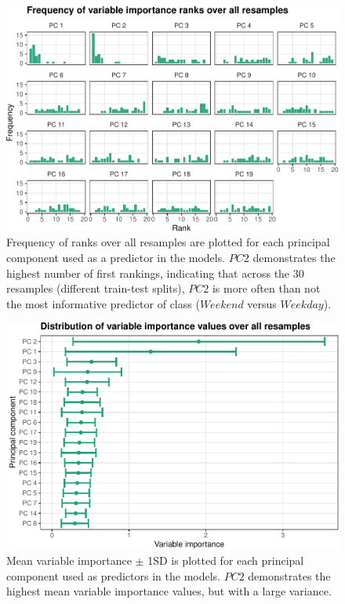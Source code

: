 \documentclass{article}
\begin{document}
\begin{figure}
\centering
\includegraphics{olet5610_report_files/figure-latex/impranks-1.pdf}
\caption{Frequency of ranks over all resamples are plotted for each
principal component used as a predictor in the models. \(PC 2\)
demonstrates the highest number of first rankings, indicating that
across the 30 resamples (different train-test splits), \(PC 2\) is more
often than not the most informative predictor of class (\(Weekend\)
versus \(Weekday\)).}
\end{figure}

\begin{figure}
\centering
\includegraphics{olet5610_report_files/figure-latex/impdists-1.pdf}
\caption{Mean variable importance \(\pm\) 1SD is plotted for each
principal component used as predictors in the models. \(PC 2\)
demonstrates the highest mean variable importance values, but with a
large variance.}
\end{figure}



\end{document}
